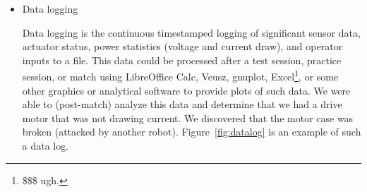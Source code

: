 \documentclass[]{article}
\begin{document}
\begin{itemize}[topsep=0pt]
\begin{figure}[h]
\begin{mdframed}
\begin{lstlisting}[basicstyle=\ttfamily\tiny]
2022/04/22 12:19:08.271 [frc.robot.commands.PullTheTriggerCommand] INFO - doing pewpew: {"shooter.speed.actual":6279.0,"turret.position.error":0.004673555493354797,"vision.range":12.095945145858876,"vision.xdegrees":-1.0410798788070679,"vision.ylocation":6.479689598083496,"shooter.speed.requested":6269.568892321029,"turret.position.requested":176.97703988850117,"turret.position.actual":176.9723663330078,"hood.position.requested":16.543897731650887,"shooter.speed.ratio":1.0015042673333603,"hood.position.ratio":0.9887104353479965,"hood.position.actual":16.35712432861328}
...
2022/04/22 12:19:20.281 [frc.robot.Robot] INFO - Interrupted StealBlueBallAuto
2022/04/22 12:19:20.321 [frc.robot.Robot] INFO - Switching from AUTONOMOUS to DISABLED
2022/04/22 12:19:20.329 [frc.robot.subsystems.TurretSubsystem] INFO - new command: frc.robot.commands.StealBlueBallAuto@e9c95d -> null
2022/04/22 12:19:20.336 [frc.robot.subsystems.ShooterSubsystem] INFO - new command: frc.robot.commands.StealBlueBallAuto@e9c95d -> null
2022/04/22 12:19:20.579 [frc.robot.Robot] INFO - Switching from DISABLED to TELEOP
2022/04/22 12:19:20.608 [frc.robot.Robot] INFO - FMS attached. Event name ROEBLING, match type Qualification, match number 91, replay number 1
2022/04/22 12:19:20.615 [frc.robot.Robot] INFO - Alliance Red, position 2
\end{lstlisting}
\caption{Event log sample}
\label{fig:eventlog}
\end{mdframed}
\end{figure}

\item Data logging

Data logging is the continuous timestamped logging of significant sensor data, actuator status, power statistics (voltage and current draw), and operator inputs to a file.
This data could be processed after a test session, practice session, or match using LibreOffice Calc, Veusz, gnuplot, Excel\footnote{\$\$\$ ugh.}, or some other graphics or analytical software to provide plots of such data.
We were able to (post-match) analyze this data and determine that we had a drive motor that was not drawing current. We discovered that the motor case was broken (attacked by another robot).
Figure~\ref{fig:datalog} is an example of such a data log.


\end{itemize}
\end{document}
